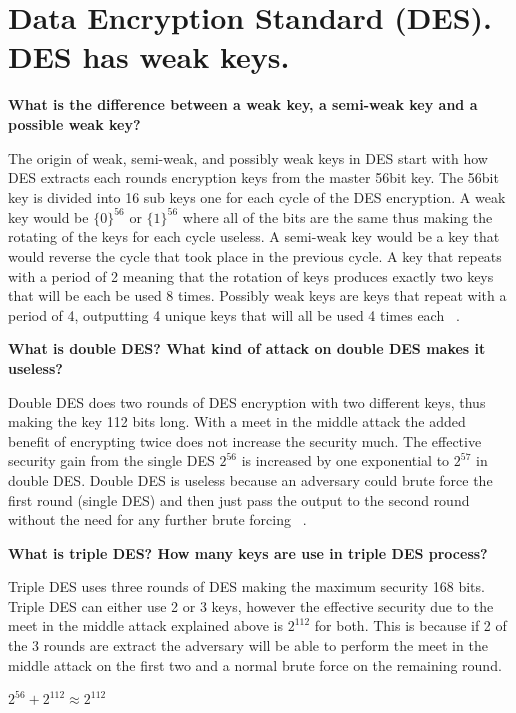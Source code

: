 \documentclass[letterpaper,11pt,notitlepage,fleqn]{article}
\begin{document}
\section{Data Encryption Standard (DES). DES has weak keys.}
\noindent \textbf{What is the difference between a weak key, a semi-weak key and a possible weak key?}

The origin of weak, semi-weak, and possibly weak keys in DES start with how DES extracts each rounds encryption keys from the master 56bit key. The 56bit key is divided into 16 sub keys one for each cycle of the DES encryption. A weak key would be $\lbrace0\rbrace^{56}$ or $\lbrace1\rbrace^{56}$ where all of the bits are the same thus making the rotating of the keys for each cycle useless. A semi-weak key would be a key that would reverse the cycle that took place in the previous cycle. A
key that repeats with a period of 2 meaning that the rotation of keys produces exactly two keys that will be each be used 8 times. Possibly weak keys are keys that repeat with a period of 4, outputting 4 unique keys that will all be used 4 times each ~\cite{3DES}.

\noindent \textbf{What is double DES?  What kind of attack on double DES makes it useless?}

Double DES does two rounds of DES encryption with two different keys, thus making the key 112 bits long. With a meet in the middle attack the added benefit of encrypting twice does not increase the security much. The effective security gain from the single DES $2^{56}$ is increased by one exponential to $2^{57}$ in double DES. Double DES is useless because an adversary could brute force the first round (single DES) and then just pass the output to the second round without the need for any further brute forcing ~\cite{meet}.

\noindent \textbf{What is triple DES?  How many keys are use in triple DES process?}

Triple DES uses three rounds of DES making the maximum security 168 bits. Triple DES can either use 2 or 3 keys, however the effective security due to the meet in the middle attack explained above is $2^{112}$ for both. This is because if 2 of the 3 rounds are extract the adversary will be able to perform the meet in the middle attack on the first two and a normal brute force on the remaining round. \\
\begin{center}
    $2^{56} + 2^{112} \approx 2^{112}$
\end{center}
\end{document}
